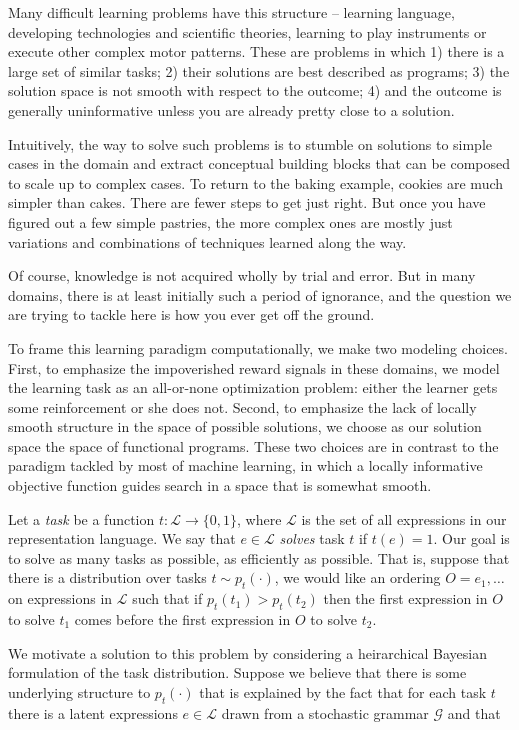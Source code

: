 \documentclass{article}
\begin{document}
Many difficult learning problems have this structure -- learning
language, developing technologies and scientific theories, learning to
play instruments or execute other complex motor patterns. These are
problems in which 1) there is a large set of similar tasks; 2) their
solutions are best described as programs; 3) the solution space is
not smooth with respect to the outcome; 4) and the outcome is generally
uninformative unless you are already pretty close to a solution.

Intuitively, the way to solve such problems is to stumble on solutions
to simple cases in the domain and extract conceptual building blocks
that can be composed to scale up to complex cases. To return to the
baking example, cookies are much simpler than cakes. There are fewer
steps to get just right. But once you have figured out a few simple
pastries, the more complex ones are mostly just variations and
combinations of techniques learned along the way. 

Of course, knowledge is not acquired wholly by trial and error. But in
many domains, there is at least initially such a period of ignorance,
and the question we are trying to tackle here is how you ever get off
the ground.

To frame this learning paradigm computationally, we make two modeling
choices. First, to emphasize the impoverished reward signals in these
domains, we model the learning task as an all-or-none optimization
problem: either the learner gets some reinforcement or she does
not. Second, to emphasize the lack of locally smooth structure in the
space of possible solutions, we choose as our solution space the space
of functional programs. These two choices are in contrast to the
paradigm tackled by most of machine learning, in which a locally
informative objective function guides search in a space that is
somewhat smooth.

Let a \emph{task} be a function $t : \mathcal{L} \rightarrow \{0,
1\}$, where $\mathcal{L}$ is the set of all expressions in our
representation language. We say that $e \in \mathcal{L}$ \emph{solves}
task $t$ if $t(e) = 1$. Our goal is to solve as many tasks as
possible, as efficiently as possible. That is, suppose that there is a
distribution over tasks $t \sim  p_t(\cdot)$, we would like an ordering $O
= e_1, \dots $ on expressions in $\mathcal{L}$ such that if $p_t(t_1)
> p_t(t_2)$ then the first expression in $O$ to solve $t_1$ comes
before the first expression in $O$ to solve $t_2$.

We motivate a solution to this problem by considering a heirarchical
Bayesian formulation of the task distribution. Suppose we believe that
there is some underlying structure to $p_t(\cdot)$ that is explained by
the fact that for each task $t$ there is a latent expressions $e \in
\mathcal{L}$ drawn from a stochastic grammar $\mathcal{G}$ and that 
\end{document}
